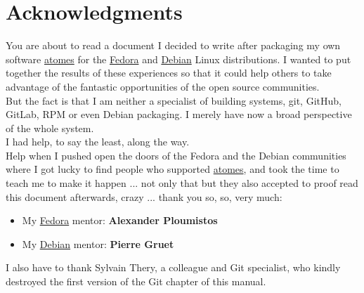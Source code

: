 \chapter*{Acknowledgments}

You are about to read a document I decided to write after packaging my own software \href{https://atomes.ipcms.fr}{atomes} for the \href{https://fedoraproject.org}{Fedora} and \href{https://www.debian.org}{Debian} Linux distributions. 
I wanted to put together the results of these experiences so that it could help others to take advantage of the fantastic opportunities of the open source communities. \\[0.25cm]
But the fact is that I am neither a specialist of building systems, git, GitHub, GitLab, RPM or even Debian packaging. 
I merely have now a broad perspective of the whole system. \\[0.25cm]
I had help, to say the least, along the way. \\[0.25cm]
Help when I pushed open the doors of the Fedora and the Debian communities where I got lucky to find people who supported \href{https://atomes.ipcms.fr}{atomes}, 
and took the time to teach me to make it happen ... not only that but they also accepted to proof read this document afterwards, crazy ... thank you so, so, very much: 
\begin{itemize}
\item My \href{https://fedoraproject.org}{Fedora} mentor: {\bf{Alexander Ploumistos}}
\item My \href{https://www.debian.org}{Debian} mentor: {\bf{Pierre Gruet}}
\end{itemize}
I also have to thank Sylvain Thery, a colleague and Git specialist, who kindly destroyed the first version of the Git chapter of this manual. 

